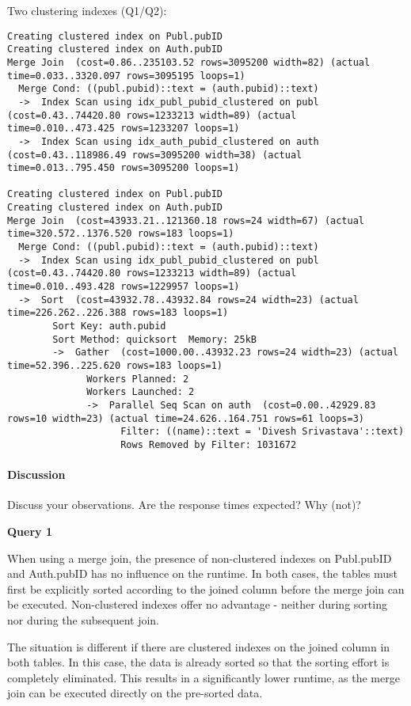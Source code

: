 \documentclass[11pt]{scrartcl}
\begin{document}
Two clustering indexes  (Q1/Q2):
{\small
\parskip0pt\begin{verbatim}
Creating clustered index on Publ.pubID
Creating clustered index on Auth.pubID
Merge Join  (cost=0.86..235103.52 rows=3095200 width=82) (actual time=0.033..3320.097 rows=3095195 loops=1)
  Merge Cond: ((publ.pubid)::text = (auth.pubid)::text)
  ->  Index Scan using idx_publ_pubid_clustered on publ  (cost=0.43..74420.80 rows=1233213 width=89) (actual time=0.010..473.425 rows=1233207 loops=1)
  ->  Index Scan using idx_auth_pubid_clustered on auth  (cost=0.43..118986.49 rows=3095200 width=38) (actual time=0.013..795.450 rows=3095200 loops=1)

Creating clustered index on Publ.pubID
Creating clustered index on Auth.pubID
Merge Join  (cost=43933.21..121360.18 rows=24 width=67) (actual time=320.572..1376.520 rows=183 loops=1)
  Merge Cond: ((publ.pubid)::text = (auth.pubid)::text)
  ->  Index Scan using idx_publ_pubid_clustered on publ  (cost=0.43..74420.80 rows=1233213 width=89) (actual time=0.010..493.428 rows=1229957 loops=1)
  ->  Sort  (cost=43932.78..43932.84 rows=24 width=23) (actual time=226.262..226.388 rows=183 loops=1)
        Sort Key: auth.pubid
        Sort Method: quicksort  Memory: 25kB
        ->  Gather  (cost=1000.00..43932.23 rows=24 width=23) (actual time=52.396..225.620 rows=183 loops=1)
              Workers Planned: 2
              Workers Launched: 2
              ->  Parallel Seq Scan on auth  (cost=0.00..42929.83 rows=10 width=23) (actual time=24.626..164.751 rows=61 loops=3)
                    Filter: ((name)::text = 'Divesh Srivastava'::text)
                    Rows Removed by Filter: 1031672
\end{verbatim}}

\paragraph{Discussion}

Discuss your observations. Are the response times expected? Why (not)?

\textbf{Query 1}

When using a merge join, the presence of non-clustered indexes on
Publ.pubID and Auth.pubID has no influence on the runtime.  In both
cases, the tables must first be explicitly sorted according to the
joined column before the merge join can be executed.  Non-clustered
indexes offer no advantage - neither during sorting nor during the
subsequent join.

The situation is different if there are clustered indexes on the joined
column in both tables.  In this case, the data is already sorted so that
the sorting effort is completely eliminated.  This results in a
significantly lower runtime, as the merge join can be executed directly
on the pre-sorted data.
\end{document}
